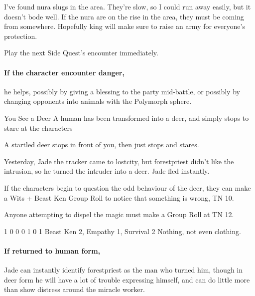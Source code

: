 \begin{multicols}{2}
\begin{speechtext}

	I've found nura slugs in the area.
	They're slow, so I could run away easily, but it doesn't bode well.
	If the nura are on the rise in the area, they must be coming from somewhere.
	Hopefully \gls{king} will make sure to raise an army for everyone's protection.

\end{speechtext}

Play the next Side Quest's encounter immediately.
\paragraph{If the character encounter danger,}
he helps, possibly by giving a blessing to the party mid-battle, or possibly by changing opponents into animals with the Polymorph sphere.

\forestpriest

{You See a Deer}%
{A human has been transformed into a deer, and simply stops to stare at the characters}%

\begin{boxtext}

	A startled deer stops in front of you, then just stops and stares.

\end{boxtext}

Yesterday, Jade the tracker came to \gls{lostcity}, but \gls{forestpriest} didn't like the intrusion, so he turned the intruder into a deer.
Jade fled instantly.

If the characters begin to question the odd behaviour of the deer, they can make a Wits + Beast Ken Group Roll to notice that something is wrong, TN 10.

Anyone attempting to dispel the magic must make a Group Roll at TN 12.

	{1}%
	{0}%
	{{0}%
	{0}%
	{1}}%
	{0}%
	{1}%
	{Beast Ken 2, Empathy 1, Survival 2}%
	{Nothing, not even clothing.}%
	{}

\paragraph{If returned to human form,}
Jade can instantly identify \gls{forestpriest} as the man who turned him, though in deer form he will have a lot of trouble expressing himself, and can do little more than show distress around the miracle worker.


\end{multicols}
